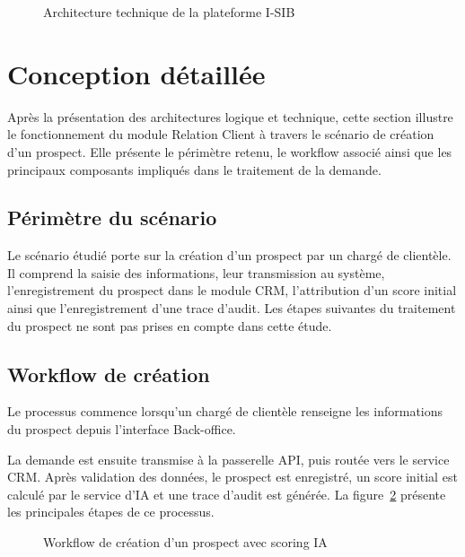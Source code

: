 \begin{figure}[H]
    \centering
    \caption{Architecture technique de la plateforme I-SIB}
    \label{fig:architecture_technique}
\end{figure}

\section{Conception détaillée}


Après la présentation des architectures logique et technique, cette section illustre le fonctionnement du module Relation Client à travers le scénario de création d’un prospect. Elle présente le périmètre retenu, le workflow associé ainsi que les principaux composants impliqués dans le traitement de la demande.
\subsection{Périmètre du scénario}



Le scénario étudié porte sur la création d'un prospect par un chargé de clientèle. Il comprend la saisie des informations, leur transmission au système, l'enregistrement du prospect dans le module CRM, l'attribution d'un score initial ainsi que l'enregistrement d'une trace d'audit. Les étapes suivantes du traitement du prospect ne sont pas prises en compte dans cette étude.

\subsection{Workflow de création}

Le processus commence lorsqu'un chargé de clientèle renseigne les informations du prospect depuis l'interface Back-office.

 La demande est ensuite transmise à la passerelle API, puis routée vers
le service CRM. Après validation des données, le prospect est enregistré, un score
initial est calculé par le service d’IA et une trace d’audit est générée. La
figure~\ref{fig:workflow_creation_prospect} présente les principales étapes de ce
processus.

\begin{figure}[H]
    \centering
    \caption{Workflow de création d'un prospect avec scoring IA}
    \label{fig:workflow_creation_prospect}
\end{figure}

